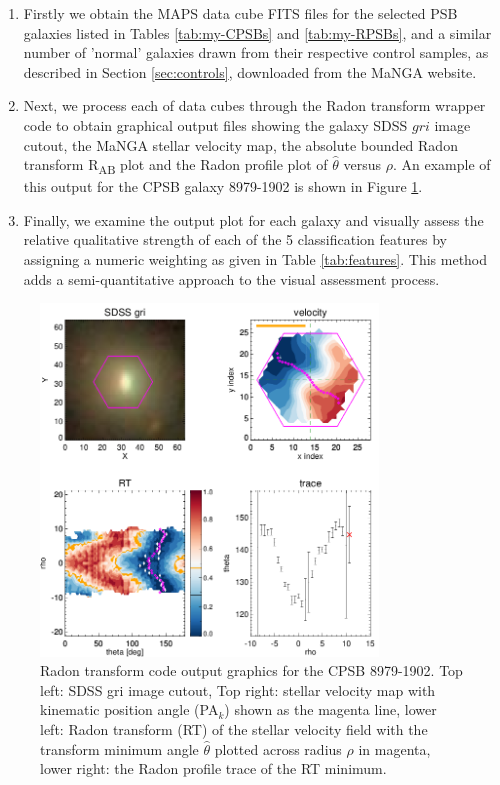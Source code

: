 \begin{enumerate}
    \item Firstly we obtain the MAPS data cube FITS files for the selected PSB galaxies listed in Tables \ref{tab:my-CPSBs} and \ref{tab:my-RPSBs}, and a similar number of 'normal' galaxies drawn from their respective control samples, as described in Section \ref{sec:controls}, downloaded from the MaNGA website.
    \item Next, we process each of data cubes through the Radon transform wrapper code to obtain graphical output files showing the galaxy SDSS $gri$ image cutout, the MaNGA stellar velocity map, the absolute bounded Radon transform R\textsubscript{AB} plot and the Radon profile plot of $\hat{\theta}$ versus $\rho$. An example of this output for the CPSB galaxy 8979-1902 is shown in Figure \ref{fig:CPSB-8979-1902-SNIP}. 
    \item  Finally, we examine the output plot for each galaxy and visually assess the relative qualitative strength of each of the 5 classification features by assigning a numeric weighting as given in Table \ref{tab:features}. This method adds a semi-quantitative approach to the visual assessment process.
\end{enumerate}

\begin{figure}
    \centering
    \includegraphics[width=0.8\textwidth]{images/RadonPlots/RT-SNIPS-NEW/CPSB-8979-1902-SNIP.png}
    \caption[Radon transform code output graphics for the CPSB 8979-1902]{Radon transform code output graphics for the CPSB 8979-1902. Top left: SDSS gri image cutout, Top right: stellar velocity map with kinematic position angle (PA$_{k}$) shown as the magenta line, lower left: Radon transform (RT) of the stellar velocity field with the transform minimum angle $\hat\theta$ plotted across radius $\rho$ in magenta, lower right: the Radon profile trace of the RT minimum.}
    \label{fig:CPSB-8979-1902-SNIP}
\end{figure}

